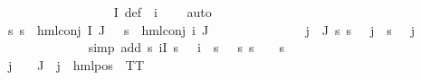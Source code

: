 \begin{isabellebody}
\ \ \ \ \ \ \ \ \ \ \ \ \isamarkupfalse%
\ {\isacartoucheopen}{\isasymphi}\ {\isasymin}\ {\isasymPhi}\ {\isacharbackquote}{\kern0pt}\ I{\isacartoucheclose}\ {\isasymPsi}{\isacharunderscore}{\kern0pt}def\ {\isacartoucheopen}{\isasymPhi}\ i{\isacharunderscore}{\kern0pt}{\isasymphi}\ {\isacharequal}{\kern0pt}\ {\isasymphi}{\isacartoucheclose}\ \isamarkupfalse%
\ auto\isanewline
\ \ \ \ \ \ \ \ \ \ \isamarkupfalse%
\ {\isachardoublequoteopen}{\isasymforall}s{\isachardot}{\kern0pt}\ s\ {\isasymTurnstile}\ {\isacharparenleft}{\kern0pt}hml{\isacharunderscore}{\kern0pt}conj\ I\ J\ {\isasymPhi}{\isacharparenright}{\kern0pt}\ {\isasymlongleftrightarrow}\ s\ {\isasymTurnstile}\ {\isacharparenleft}{\kern0pt}hml{\isacharunderscore}{\kern0pt}conj\ {\isacharbraceleft}{\kern0pt}i{\isacharunderscore}{\kern0pt}{\isasymphi}{\isacharbraceright}{\kern0pt}\ J\ {\isasymPsi}{\isacharparenright}{\kern0pt}{\isachardoublequoteclose}\isanewline
\ \ \ \ \ \ \ \ \ \ \ \ \isamarkupfalse%
\ {\isacartoucheopen}{\isasymforall}j\ {\isasymin}\ J{\isachardot}{\kern0pt}\ {\isacharparenleft}{\kern0pt}{\isasymforall}s{\isachardot}{\kern0pt}\ {\isacharparenleft}{\kern0pt}s\ {\isasymTurnstile}\ {\isasymPhi}\ j{\isacharparenright}{\kern0pt}\ {\isasymlongleftrightarrow}\ {\isacharparenleft}{\kern0pt}s\ {\isasymTurnstile}\ {\isasymPsi}\ j{\isacharparenright}{\kern0pt}{\isacharparenright}{\kern0pt}{\isacartoucheclose}\isanewline
\ \ \ \ \ \ \ \ \ \ \ \ \isamarkupfalse%
\ {\isacharparenleft}{\kern0pt}simp\ add{\isacharcolon}{\kern0pt}\ {\isacartoucheopen}{\isasymforall}s{\isachardot}{\kern0pt}\ {\isacharparenleft}{\kern0pt}{\isasymforall}i{\isasymin}I{\isachardot}{\kern0pt}\ s\ {\isasymTurnstile}\ {\isasymPhi}\ i{\isacharparenright}{\kern0pt}\ {\isacharequal}{\kern0pt}\ {\isacharparenleft}{\kern0pt}s\ {\isasymTurnstile}\ {\isasymphi}{\isacharparenright}{\kern0pt}{\isacartoucheclose}\ {\isacartoucheopen}{\isasymforall}s{\isachardot}{\kern0pt}\ {\isacharparenleft}{\kern0pt}s\ {\isasymTurnstile}\ {\isasymphi}{\isacharparenright}{\kern0pt}\ {\isacharequal}{\kern0pt}\ {\isacharparenleft}{\kern0pt}s\ {\isasymTurnstile}\ {\isasympsi}{\isacharparenright}{\kern0pt}{\isacartoucheclose}{\isacharparenright}{\kern0pt}\isanewline
\ \ \ \ \ \ \ \ \ \ \isamarkupfalse%
\ {\isachardoublequoteopen}{\isasymforall}j\ {\isasymin}\ {\isasymPsi}\ {\isacharbackquote}{\kern0pt}\ J{\isachardot}{\kern0pt}\ {\isasymexists}{\isasymalpha}{\isachardot}{\kern0pt}\ j\ {\isacharequal}{\kern0pt}\ {\isacharparenleft}{\kern0pt}hml{\isacharunderscore}{\kern0pt}pos\ {\isasymalpha}\ TT{\isacharparenright}{\kern0pt}{\isachardoublequoteclose}\ \isanewline

\end{isabellebody}
